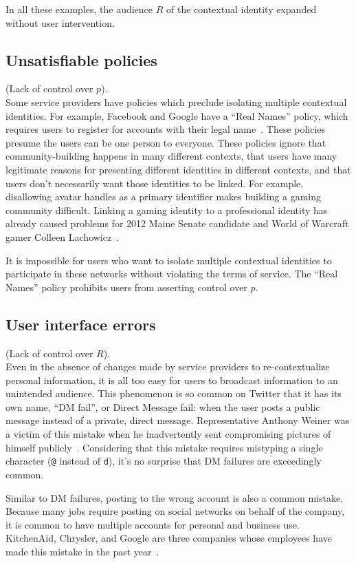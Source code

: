 \documentclass{llncs}
\begin{document}
In all these examples, the audience $R$ of the contextual identity expanded without user
intervention.

\subsection{Unsatisfiable policies}
\label{sec:policies}
(Lack of control over $p$).\\
Some service providers have policies which preclude isolating multiple
contextual identities. For example, Facebook and Google have a ``Real Names'' policy, which
requires users to register for accounts with their legal
name~\cite{fb_names,google_names}.  These policies presume the users can be one
person to everyone. These policies ignore that community-building happens in
many different contexts, that users have many legitimate reasons for presenting
different identities in different contexts, and that users don't necessarily
want those identities to be linked. For example, disallowing avatar handles as
a primary identifier makes building a gaming community difficult. 
Linking a gaming identity to a professional identity has already caused
problems for 2012 Maine Senate candidate
and World of Warcraft gamer Colleen Lachowicz~\cite{maine}.

It is impossible for users who want to isolate multiple contextual identities
to participate in these networks without violating the terms of service.  The
``Real Names'' policy prohibits users from asserting control over $p$.

\subsection{User interface errors}
(Lack of control over $R$).\\
Even in the absence of changes made by service providers to re-contextualize
personal information, it is all too easy for users to broadcast information to
an unintended audience. This phenomenon is so common on Twitter that it has its
own name, ``DM fail'', or Direct Message fail: when the user posts a public
message instead of a private, direct message. Representative Anthony Weiner was
a victim of this mistake when he inadvertently sent compromising pictures of
himself publicly~\cite{weiner}. Considering that this mistake requires
mistyping a single character (\texttt{@} instead of \texttt{d}), it's no
surprise that DM failures are exceedingly common.

Similar to DM failures, posting to the wrong account is also a common mistake.
Because many jobs require posting on social networks on behalf of the company,
it is common to have multiple accounts for personal and business use.
KitchenAid, Chrysler, and Google are three companies whose employees have
made this mistake in the past year~\cite{kitchenaid,chrysler,yegge}.
\end{document}
